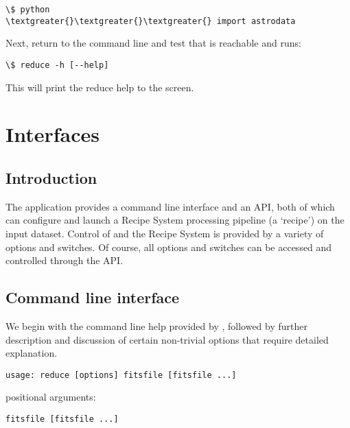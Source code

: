 \documentclass[letterpaper,10pt,english]{sphinxmanual}
\begin{document}
\begin{Verbatim}[commandchars=\\\{\}]
\$ python
\textgreater{}\textgreater{}\textgreater{} import astrodata
\end{Verbatim}

Next, return to the command line and test that  is reachable
and runs:

\begin{Verbatim}[commandchars=\\\{\}]
\$ reduce -h [--help]
\end{Verbatim}

This will print the reduce help to the screen.


\chapter{Interfaces}
\label{interfaces:interfaces}\label{interfaces::doc}

\section{Introduction}
\label{interfaces:introduction}
The  application provides a command line interface and an API, both
of which can configure and launch a Recipe System processing pipeline (a `recipe')
on the input dataset. Control of  and the Recipe System is provided
by a variety of options and switches. Of course, all options and switches
can be accessed and controlled through the API.


\section{Command line interface}
\label{interfaces:command-line-interface}
We begin with the command line help provided by , followed by
further description and discussion of certain non-trivial options that require
detailed explanation.

\begin{Verbatim}[commandchars=\\\{\}]
usage: reduce [options] fitsfile [fitsfile ...]
\end{Verbatim}

positional arguments:

\begin{Verbatim}[commandchars=\\\{\}]
fitsfile [fitsfile ...]
\end{Verbatim}
\end{document}
